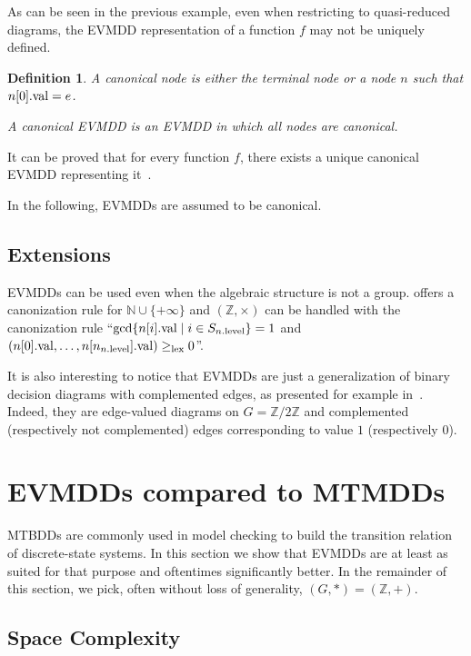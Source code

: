 \documentclass[nocover]             %
{NASA}                       %
\newcommand{\N}{\mathbb{N}}
\newcommand{\Z}{\mathbb{Z}}
\newtheorem{mydefinition}{Definition}[section]
\newcommand{\val}[1]{#1{\rm .val}}
\newcommand{\level}[1]{#1{\rm .level}}
\begin{document}
As can be seen in the previous example, even when restricting to quasi-reduced diagrams,
the EVMDD representation of a function $f$ may not be uniquely defined.

\begin{mydefinition}
A \emph{canonical node} is either the terminal node or a node $n$ such that $\val{n[0]} = e$.

A \emph{canonical EVMDD} is an EVMDD in which all nodes are canonical.
\end{mydefinition}

It can be proved that for every function $f$, there exists a unique
canonical EVMDD representing it~\cite{FMCAD2002}.

In the following, EVMDDs are assumed to be canonical.

\subsection{Extensions%
  \label{subsection-extensions}}

EVMDDs can be used even when the algebraic structure is not a group.
\cite{FMCAD2002} offers a canonization rule for $\N\cup \{+\infty\}$ and
$(\Z, \times)$ can be handled with the canonization rule
``${\rm gcd}\{\val{n[i]}\;|\; i \in S_{\level{n}}\} = 1$ and
$(\val{n[0]},\ldots, \val{n[n_{\level{n}}]}) \geq_{\rm lex} 0$''.

It is also interesting to notice that EVMDDs are just a generalization
of binary decision diagrams with complemented edges, as presented for example
in~\cite{Brace1990}. Indeed, they are edge-valued diagrams on $G = \Z/2\Z$
and complemented (respectively not complemented) edges corresponding to value $1$ (respectively $0$).

\section{EVMDDs compared to MTMDDs}

MTBDDs are commonly used in model checking to build the transition 
relation of discrete-state systems. In this section we show that EVMDDs 
are at least as suited for that purpose and oftentimes significantly 
better. In the remainder of this section, we pick, often without loss of 
generality, $(G, *) = (\Z, +)$.

\subsection{Space Complexity}
\end{document}
